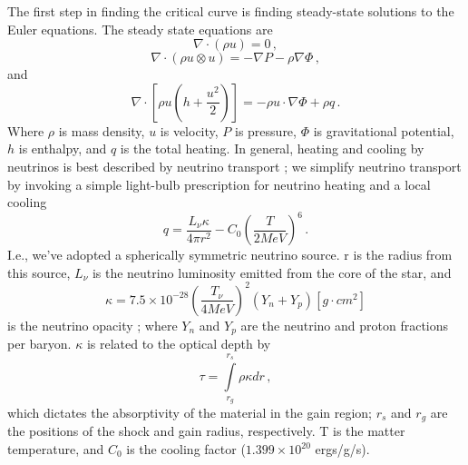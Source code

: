 \documentclass[twocolumn]{aastex6}
\begin{document}
The first step in finding the critical curve is finding
steady-state solutions to the Euler equations. The steady state equations are
\begin{equation}
\nabla \cdot (\rho u) = 0 \, ,
\label{mass}
\end{equation}
\begin{equation}
\nabla \cdot (\rho u \otimes u) = -\nabla P - \rho\nabla\Phi  \, ,
\end{equation}
and
\begin{equation}
\nabla\cdot \left [\rho u \left (h + \frac{u^2}{2} \right ) \right ] = - \rho u \cdot \nabla\Phi +\rho q \, .
\label{energy}
\end{equation}
Where $\rho$ is mass density, $u$ is velocity, $P$ is
  pressure, $\Phi$ is gravitational potential, $h$ is enthalpy, and $q$ is
  the total heating. In general, heating and cooling by
neutrinos is best described by neutrino transport \citep{janka17a,tamborra17}; we simplify neutrino transport by invoking a
simple light-bulb prescription for neutrino heating and a local cooling \citep{janka01}
\begin{equation}      
q = \frac{L_\nu \kappa}{4\pi r^2} - C_0 \left (\frac{T}{2 MeV}\right )^6 \, .
\end{equation}
I.e., we've adopted a spherically symmetric neutrino source. r is the radius from this source, $L_\nu$ is the neutrino luminosity emitted from the core of the star, and
  \begin{equation}
  \kappa = 7.5 \times 10^{-28} \left ( \frac{T_\nu}{4 MeV} \right )^2 (Y_n + Y_p) [g \cdot cm^2]
  \end{equation}
   is the neutrino opacity \citep{murphy13}; where $Y_n$ and $Y_p$ are the neutrino and proton fractions per baryon. $\kappa$ is related to the optical depth by
\begin{equation}
\tau = \int\limits_{r_g}^{r_s} \rho \kappa dr \, ,
\end{equation}
which dictates the absorptivity of the material in the gain region; $r_s$ and $r_g$ are the positions of the shock and gain radius, respectively. T is the
  matter temperature, and $C_0$ is the cooling factor ($1.399 \times
  10^{20}$ ergs/g/s). 
  
\end{document}
